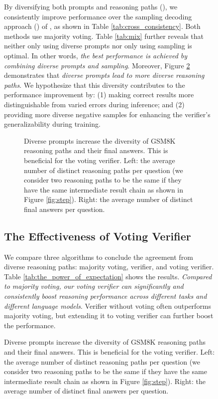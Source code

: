 \documentclass[11pt,a4paper]{article}
\begin{document}
\begin{figure}[t]
\begin{tcolorbox}[colback=blue!5!white,colframe=blue!75!black,title=Chain-Of-Thought Reasoning for GSM8K Math Word Problem,fontupper=\footnotesize,fonttitle=\scriptsize]
By diversifying both prompts and reasoning paths (), we consistently improve performance over the sampling decoding approach () of \citet{selfconsistency}, as shown in Table \ref{tab:cross_consistency}. Both methods use majority voting. Table \ref{tab:mix} further reveals that neither only using diverse prompts nor only using sampling is optimal. In other words, \emph{the best performance is achieved by combining diverse prompts and sampling}. Moreover, Figure \ref{fig:diversity} demonstrates that \textit{diverse prompts lead to more diverse reasoning paths}. We hypothesize that this diversity contributes to the performance improvement by: (1) making correct results more distinguishable from varied errors during inference; and (2) providing more diverse negative samples for enhancing the verifier's generalizability during training.



\begin{figure}[t]
\centering
{}
\caption{Diverse prompts increase the diversity of GSM8K reasoning paths and their final answers. This is beneficial for the voting verifier. Left: the average number of distinct reasoning paths per question (we consider two reasoning paths to be the same if they have the same intermediate result chain as shown in Figure \ref{fig:step}). Right: the average number of distinct final answers per question.}
\label{fig:diversity}
\end{figure}


\subsection{The Effectiveness of Voting Verifier}
\label{sec:power_of_voting_verifier}

We compare three algorithms to conclude the agreement from diverse reasoning paths: majority voting, verifier, and voting verifier.
Table \ref{tab:the_power_of_expectation} shows the results. 
\emph{Compared to majority voting, our voting verifier can significantly and consistently boost reasoning performance across different tasks and different language models}.
Verifier without voting often outperforms majority voting, but extending it to voting verifier can further boost the performance.








\end{tcolorbox}
\end{figure}
\end{document}
